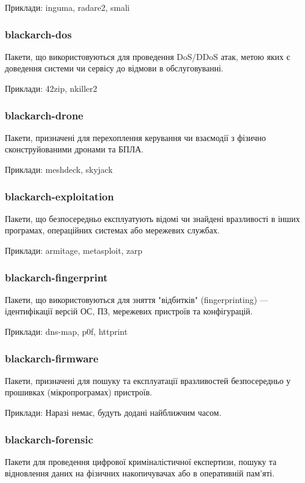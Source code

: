 \documentclass[a4paper, oneside, 11pt]{book}
\begin{document}
Приклади: inguma, radare2, smali

\subsubsection{blackarch-dos}
Пакети, що використовуються для проведення DoS/DDoS атак, метою яких є доведення системи чи сервісу до відмови в обслуговуванні.

Приклади: 42zip, nkiller2

\subsubsection{blackarch-drone}
Пакети, призначені для перехоплення керування чи взаємодії з фізично сконструйованими дронами та БПЛА.

Приклади: meshdeck, skyjack

\subsubsection{blackarch-exploitation}
Пакети, що безпосередньо експлуатують відомі чи знайдені вразливості в інших програмах, операційних системах або мережевих службах.

Приклади: armitage, metasploit, zarp

\subsubsection{blackarch-fingerprint}
Пакети, що використовуються для зняття "відбитків" (fingerprinting) --- ідентифікації версій ОС, ПЗ, мережевих пристроїв та конфігурацій.

Приклади: dns-map, p0f, httprint

\subsubsection{blackarch-firmware}
Пакети, призначені для пошуку та експлуатації вразливостей безпосередньо у прошивках (мікропрограмах) пристроїв.

Приклади: Наразі немає, будуть додані найближчим часом.

\subsubsection{blackarch-forensic}
Пакети для проведення цифрової криміналістичної експертизи, пошуку та відновлення даних на фізичних накопичувачах або в оперативній пам'яті.
\end{document}
